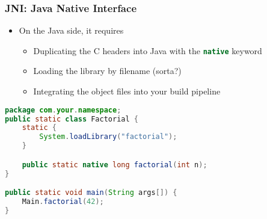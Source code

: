 \documentclass[10pt,mathserif]{beamer}
\begin{document}
	\begin{frame}[fragile]
		\frametitle{JNI: Java Native Interface}

		\begin{itemize}
			\item On the Java side, it requires
			\begin{itemize}
				\item Duplicating the C headers into Java with the \lstinline[language=java]{native} keyword
				\item Loading the library by filename (sorta?)
				\item Integrating the object files into your build pipeline

			\end{itemize}
		\end{itemize}

		\begin{lstlisting}[language=java]
package com.your.namespace;
public static class Factorial {
	static {
		System.loadLibrary("factorial");
	}

	public static native long factorial(int n);
}

public static void main(String args[]) {
	Main.factorial(42);
}
		\end{lstlisting}
	\end{frame}
\end{document}
